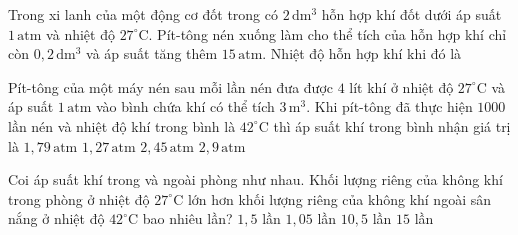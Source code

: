 \begin{ex}
Trong xi lanh của một động cơ đốt trong có $2\,\mathrm{dm^3}$ hỗn hợp khí đốt dưới áp suất $1\,\mathrm{atm}$ và nhiệt độ $27^\circ\mathrm{C}$. Pít-tông nén xuống làm cho thể tích của hỗn hợp khí chỉ còn $0,2\,\mathrm{dm^3}$ và áp suất tăng thêm $15\,\mathrm{atm}$. Nhiệt độ hỗn hợp khí khi đó là
\end{ex}

\begin{ex}
Pít-tông của một máy nén sau mỗi lần nén đưa được $4$ lít khí ở nhiệt độ $27^\circ\mathrm{C}$ và áp suất $1\,\mathrm{atm}$ vào bình chứa khí có thể tích $3\,\mathrm{m^3}$. Khi pít-tông đã thực hiện $1000$ lần nén và nhiệt độ khí trong bình là $42^\circ\mathrm{C}$ thì áp suất khí trong bình nhận giá trị là
\choice
{$1,79\,\mathrm{atm}$}
{$1,27\,\mathrm{atm}$}
{\True $2,45\,\mathrm{atm}$}
{$2,9\,\mathrm{atm}$}
\end{ex}

\begin{ex}
Coi áp suất khí trong và ngoài phòng như nhau. Khối lượng riêng của không khí trong phòng ở nhiệt độ $27^\circ\mathrm{C}$ lớn hơn khối lượng riêng của không khí ngoài sân nắng ở nhiệt độ $42^\circ\mathrm{C}$ bao nhiêu lần?
\choice
{$1{,}5$ lần}
{\True $1{,}05$ lần}
{$10{,}5$ lần}
{$15$ lần}
\end{ex}

